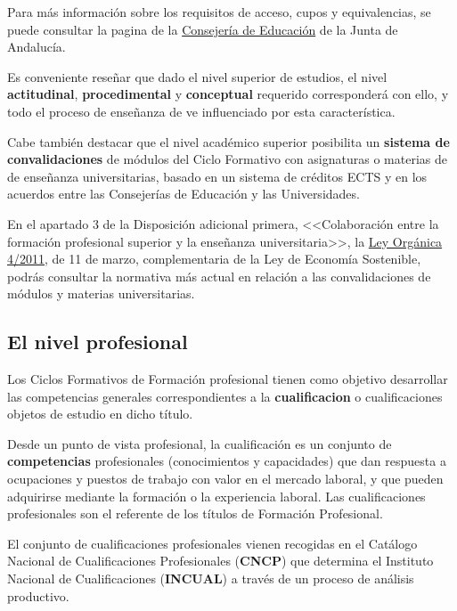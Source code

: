 Para más información sobre los requisitos de acceso, cupos y equivalencias, se puede consultar la pagina de la \href{https://www.juntadeandalucia.es/educacion/portals/web/formacion-profesional-andaluza/quiero-formarme/ensenanzas/fp-grado-superior/requisitos}{Consejería de Educación} de la Junta de Andalucía.

Es conveniente reseñar que dado el nivel superior de estudios, el nivel \textbf{\gls{actitudinal}}, \textbf{\gls{procedimental}} y \textbf{\gls{conceptual}} requerido corresponderá con ello, y todo el proceso de enseñanza de ve influenciado por esta característica.

Cabe también destacar que el nivel académico superior posibilita un \textbf{sistema de convalidaciones} de módulos del Ciclo Formativo con asignaturas o materias de de enseñanza universitarias, basado en un sistema de créditos ECTS y en los acuerdos entre las Consejerías de Educación y las Universidades.

En el apartado 3 de la Disposición adicional primera, <<Colaboración entre la formación profesional superior y la enseñanza universitaria>>, la \href{https://www.boe.es/boe/dias/2011/03/12/pdfs/BOE-A-2011-4551.pdf}{Ley Orgánica 4/2011}, de 11 de marzo, complementaria de la Ley de Economía Sostenible, podrás consultar la normativa más actual en relación a las convalidaciones de módulos y materias universitarias.

\subsection{El nivel profesional}
Los Ciclos Formativos de Formación profesional tienen como objetivo desarrollar las competencias generales correspondientes a la \textbf{\gls{cualificacion}} o cualificaciones objetos de estudio en dicho título.

Desde un punto de vista profesional, la cualificación es un conjunto de \textbf{\gls{competencias}} profesionales (conocimientos y capacidades) que dan respuesta a ocupaciones y puestos de trabajo con valor en el mercado laboral, y que pueden adquirirse mediante la formación o la experiencia laboral. Las cualificaciones profesionales son el referente de los títulos de Formación Profesional.

El conjunto de cualificaciones profesionales vienen recogidas en el Catálogo Nacional de Cualificaciones Profesionales (\textbf{CNCP}) que determina el Instituto Nacional de Cualificaciones (\textbf{INCUAL}) a través de un proceso de análisis productivo.

